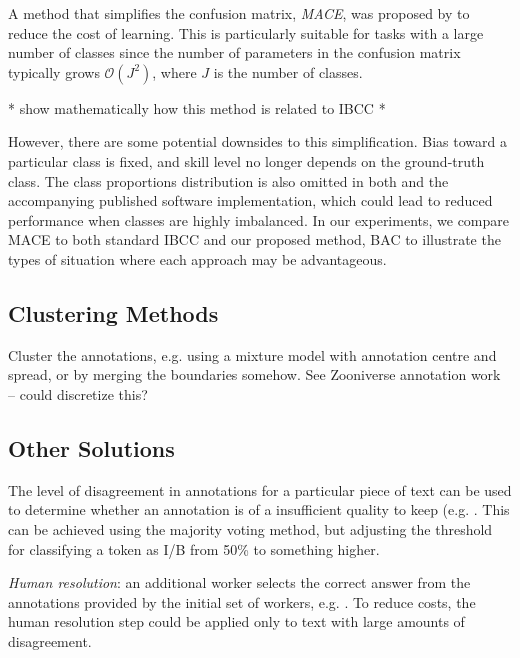 A method that simplifies the confusion matrix, \emph{MACE}, was proposed by \cite{hovy2013learning}
to reduce the cost of learning. This is particularly suitable for tasks with a large number of classes
since the number of parameters in the confusion matrix typically grows $\mathcal{O}(J^2)$, where $J$ is the number of classes.

* show mathematically how this method is related to IBCC *

However, there are some potential downsides to this simplification. Bias toward a particular class is fixed,
and skill level no longer depends on the ground-truth class. The class proportions distribution is also omitted
in both \cite{hovy2013learning} and the accompanying published software implementation, which
could lead to reduced performance when classes are highly imbalanced. 
In our experiments, we compare MACE to both standard IBCC and our proposed method, BAC to illustrate the 
types of situation where each approach may be advantageous. 

\subsection{Clustering Methods}

Cluster the annotations, e.g. using a mixture model with annotation centre and spread, or by merging the boundaries somehow. See Zooniverse annotation work -- could discretize this?

\subsection{Other Solutions}

The level of disagreement in annotations for a particular piece of text can be used to determine whether an annotation is of a insufficient quality to keep (e.g. \cite{sayeed2011crowdsourcing,hsueh2009data}. This can be achieved using the majority voting method, but adjusting the threshold for classifying a token as I/B from 50\% to something higher. 

\emph{Human resolution}: an additional worker selects the correct answer from the annotations provided by the initial set of workers, e.g. \cite{dagan2016specifying}. To reduce costs, the human resolution step could be applied only to text with large amounts of disagreement.

